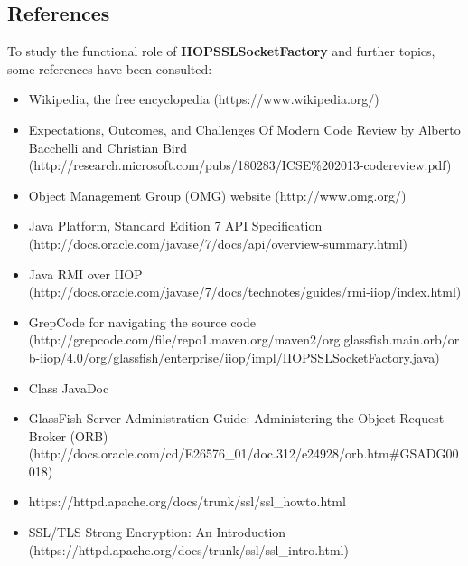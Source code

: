 \subsection{References}
To study the functional role of \textbf{IIOPSSLSocketFactory} and further topics, some references have been consulted:
\begin{itemize}
	\item Wikipedia, the free encyclopedia (https://www.wikipedia.org/)
	\item Expectations, Outcomes, and Challenges Of Modern Code Review by Alberto Bacchelli and Christian Bird (http://research.microsoft.com/pubs/180283/ICSE\%202013-codereview.pdf)
	\item Object Management Group (OMG) website (http://www.omg.org/)
	\item Java Platform, Standard Edition 7 API Specification (http://docs.oracle.com/javase/7/docs/api/overview-summary.html)
	\item Java RMI over IIOP (http://docs.oracle.com/javase/7/docs/technotes/guides/rmi-iiop/index.html)
	\item GrepCode for navigating the source code (http://grepcode.com/file/repo1.maven.org/maven2/org.glassfish.main.orb/orb-iiop/4.0/org/glassfish/enterprise/iiop/impl/IIOPSSLSocketFactory.java)
	\item Class JavaDoc
	\item GlassFish Server Administration Guide: Administering the Object Request Broker (ORB) (http://docs.oracle.com/cd/E26576_01/doc.312/e24928/orb.htm#GSADG00018)
	\item https://httpd.apache.org/docs/trunk/ssl/ssl_howto.html
	\item SSL/TLS Strong Encryption: An Introduction (https://httpd.apache.org/docs/trunk/ssl/ssl_intro.html)
\end{itemize}



